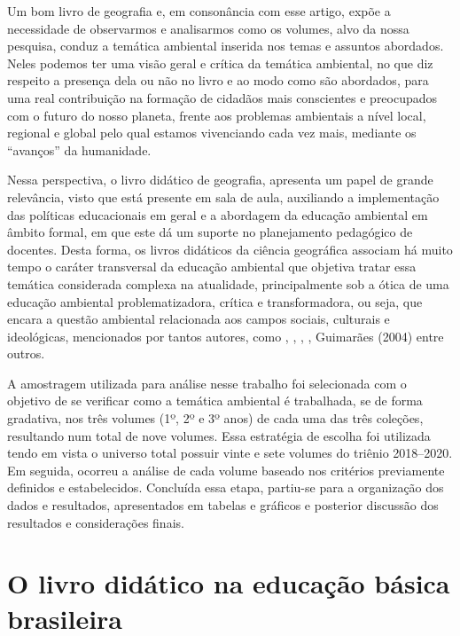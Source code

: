 \begin{refsection}
    Um bom livro de geografia e, em consonância com esse artigo, expõe a necessidade de observarmos e analisarmos como os volumes, alvo da nossa pesquisa, conduz a temática ambiental inserida nos temas e assuntos abordados. Neles podemos ter uma visão geral e crítica da temática ambiental, no que diz respeito a presença dela ou não no livro e ao modo como são abordados, para uma real contribuição na formação de cidadãos mais conscientes e preocupados com o futuro do nosso planeta, frente aos problemas ambientais a nível local, regional e global pelo qual estamos vivenciando cada vez mais, mediante os “avanços” da humanidade.  

    Nessa perspectiva, o livro didático de geografia, apresenta um papel de grande relevância, visto que está presente em sala de aula, auxiliando a implementação das políticas educacionais em geral e a abordagem da educação ambiental em âmbito formal, em que este dá um suporte no planejamento pedagógico de docentes. Desta forma, os livros didáticos da ciência geográfica associam há muito tempo o caráter transversal da educação ambiental que objetiva tratar essa temática considerada complexa na atualidade, principalmente sob a ótica de uma educação ambiental problematizadora, crítica e transformadora, ou seja, que encara a questão ambiental relacionada aos campos sociais, culturais e ideológicas, mencionados por tantos autores, como \textcite{CARVALHO2004Educação}, \textcite{LOUREIRO2006Problematizando}, \textcite{TOZONI-REIS2004Educação}, \textcite{SORRENTINO2005Educação}, Guimarães (2004) entre outros.  

    A amostragem utilizada para análise nesse trabalho foi selecionada com o objetivo de se verificar como a temática ambiental é trabalhada, se de forma gradativa, nos três volumes (1º, 2º e 3º anos) de cada uma das três coleções, resultando num total de nove volumes. Essa estratégia de escolha foi utilizada tendo em vista o universo total possuir vinte e sete volumes do triênio 2018--2020. Em seguida, ocorreu a análise de cada volume baseado nos critérios previamente definidos e estabelecidos. Concluída essa etapa, partiu-se para a organização dos dados e resultados, apresentados em tabelas e gráficos e posterior discussão dos resultados e considerações finais.  


    \section{O livro didático na educação básica brasileira}


\end{refsection}
